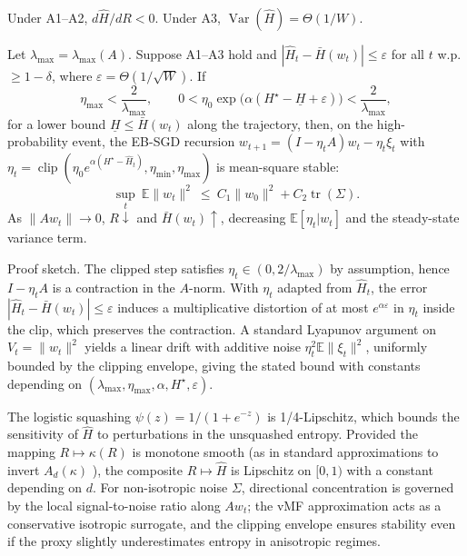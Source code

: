 \begin{lemma}
Under A1--A2, $d\widehat{H}/dR<0$. Under A3, $\operatorname{Var}(\widehat{H})=\Theta(1/W)$.
\end{lemma}

\begin{theorem}
Let $\lambda_{\max}=\lambda_{\max}(A)$. Suppose A1--A3 hold and $|\widehat{H}_t-\bar{H}(w_t)|\le \varepsilon$ for all $t$ w.p. $\ge 1-\delta$, where $\varepsilon=\Theta(1/\sqrt{W})$. If
\[
\eta_{\max} < \frac{2}{\lambda_{\max}},\qquad
0< \eta_0 \exp\!\big(\alpha(H^\star - \underline{H} + \varepsilon)\big) < \frac{2}{\lambda_{\max}},
\]
for a lower bound $\underline{H}\le \bar{H}(w_t)$ along the trajectory, then, on the high-probability event, the EB-SGD recursion
$
w_{t+1}=(I-\eta_t A)w_t - \eta_t \xi_t
$
with $\eta_t=\operatorname{clip}\left(\eta_0 e^{\alpha(H^\star-\widehat{H}_t)},\eta_{\min},\eta_{\max}\right)$ is mean-square stable:
\[
\sup_t \ \mathbb{E}\|w_t\|^2 \ \le\ C_1 \|w_0\|^2 + C_2 \operatorname{tr}(\Sigma).
\]
As $\|Aw_t\|\to 0$, $R\downarrow$ and $\bar{H}(w_t)\uparrow$, decreasing $\mathbb{E}[\eta_t|w_t]$ and the steady-state variance term.
\end{theorem}

\noindent Proof sketch. The clipped step satisfies $\eta_t\in(0,2/\lambda_{\max})$ by assumption, hence $I-\eta_t A$ is a contraction in the $A$-norm. With $\eta_t$ adapted from $\widehat{H}_t$, the error $|\widehat{H}_t-\bar{H}(w_t)|\le\varepsilon$ induces a multiplicative distortion of at most $e^{\alpha\varepsilon}$ in $\eta_t$ inside the clip, which preserves the contraction. A standard Lyapunov argument on $V_t=\|w_t\|^2$ yields a linear drift with additive noise $\eta_t^2\mathbb{E}\|\xi_t\|^2$, uniformly bounded by the clipping envelope, giving the stated bound with constants depending on $(\lambda_{\max},\eta_{\max},\alpha,H^\star,\varepsilon)$.

\begin{remark}
The logistic squashing $\psi(z)=1/(1+e^{-z})$ is 1/4-Lipschitz, which bounds the sensitivity of $\widehat{H}$ to perturbations in the unsquashed entropy. Provided the mapping $R\mapsto \kappa(R)$ is monotone smooth (as in standard approximations to invert $A_d(\kappa)$ \cite{MardiaJupp2000Directional}), the composite $R\mapsto \widehat{H}$ is Lipschitz on $[0,1)$ with a constant depending on $d$. For non-isotropic noise $\Sigma$, directional concentration is governed by the local signal-to-noise ratio along $Aw_t$; the vMF approximation acts as a conservative isotropic surrogate, and the clipping envelope ensures stability even if the proxy slightly underestimates entropy in anisotropic regimes.
\end{remark}

